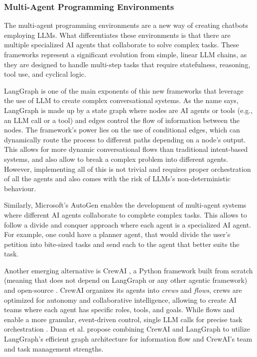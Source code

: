 \subsubsection{Multi-Agent Programming Environments}

The multi-agent programming environments are a new way
of creating chatbots employing \acp{LLM}.
What differentiates these environments is that
there are multiple specialized \ac{AI} agents
that collaborate to solve complex tasks.
These frameworks represent a significant evolution from
simple, linear \ac{LLM} chains, as they are designed to
handle multi-step tasks that require
statefulness, reasoning, tool use, and cyclical logic.

LangGraph \autocite{LangGraph} is one of the main exponents
of this new frameworks that leverage the use of \ac{LLM}
to create complex conversational systems.
As the name says, LangGraph is made up by a state graph
where nodes are \ac{AI} agents or tools (e.g., an \ac{LLM} call or a tool)
and edges control the flow of information between the nodes.
The framework's power lies on the use of conditional edges,
which can dynamically route the process to different paths
depending on a node's output.
This allows for more dynamic conversational flows
than traditional intent-based systems,
and also allow to break a complex problem into different agents.
However, implementing all of this is not trivial
and requires proper orchestration of all the agents
and also comes with the risk of \acp{LLM}'s non-deterministic behaviour.

Similarly, Microsoft's AutoGen \autocite{AutoGen}
enables the development of multi-agent systems
where different \ac{AI} agents collaborate to complete complex tasks.
This allows to follow a divide and conquer approach
where each agent is a specialized \ac{AI} agent.
For example, one could have a planner agent,
that would divide the user's petition into bite-sized tasks
and send each to the agent that better suits the task.

Another emerging alternative is CrewAI \autocite{CrewAI},
a Python framework built from scratch
(meaning that does not depend on LangGraph or any other agentic framework)
and open-source \autocite{CrewAIIncCrewAI2025}.
CrewAI organizes its agents into \textit{crews} and \textit{flows},
crews are optimized for autonomy and collaborative intelligence,
allowing to create AI teams where each agent has specific roles, tools, and goals.
While flows and enable a more granular, event-driven control,
single LLM calls for precise task orchestration \autocite{CrewAIIntroduction}.
Duan et al. \autocite{duanExplorationLLMMultiAgent2024}
propose combining CrewAI and LangGraph
to utilize LangGraph's efficient graph architecture for information flow
and CrewAI’s team and task management strengths.

